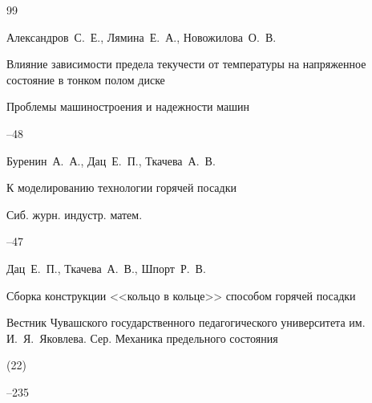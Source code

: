 \begin{thebibliography}{99}








\by Александров~С.~Е., Лямина~Е.~А., Новожилова~О.~В. 

\paper Влияние зависимости предела текучести от температуры на напряженное состояние в тонком полом диске 

\jour Проблемы машиностроения и надежности машин



--48





\by Буренин~А.~А., Дац~Е.~П., Ткачева~А.~В.

\paper К моделированию технологии горячей посадки

\jour Сиб. журн. индустр. матем.




--47








\by Дац~Е.~П., Ткачева~А.~В., Шпорт~Р.~В.

\paper Сборка конструкции <<кольцо в кольце>> способом горячей посадки  

\jour Вестник Чувашского государственного педагогического университета им. И.~Я.~Яковлева. Сер. Механика предельного состояния


(22)

--235


%




\end{thebibliography}

